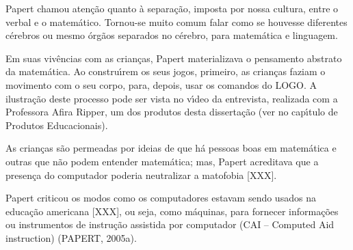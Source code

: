 \documentclass[
12pt,		%
openright,	%
twoside,  %
a4paper,			%
chapter=TITLE,		%
english,			%
french,				%
spanish,			%
brazil				%
]{USPSC-classe/USPSC}
\begin{document}
Papert chamou aten\c{c}\~ao quanto \`a separa\c{c}\~ao, imposta por nossa cultura, entre o verbal e o matem\'atico. Tornou-se muito comum falar como se houvesse diferentes c\'erebros ou mesmo \'org\~aos separados no c\'erebro, para matem\'atica e linguagem.

















Em suas viv\^encias com as crian\c{c}as, Papert materializava o pensamento abstrato da matem\'atica. Ao constru\'{\i}rem os seus jogos, primeiro, as crian\c{c}as faziam o movimento com o seu corpo, para, depois, usar os comandos do LOGO. A ilustra\c{c}\~ao deste processo pode ser vista no v\'{\i}deo  da entrevista, realizada com a Professora Afira Ripper,  um dos produtos desta disserta\c{c}\~ao (ver no cap\'{\i}tulo de Produtos Educacionais).

















As crian\c{c}as s\~ao permeadas por ideias de que h\'a pessoas boas em matem\'atica e outras que n\~ao podem entender matem\'atica; mas, Papert acreditava que a presen\c{c}a do computador poderia neutralizar a matofobia [XXX].

















Papert criticou os modos como os computadores estavam sendo usados na educa\c{c}\~ao americana [XXX], ou seja, como m\'aquinas, para fornecer informa\c{c}\~oes ou instrumentos de instru\c{c}\~ao assistida por computador (CAI – Computed Aid instruction)  (PAPERT, 2005a).
\end{document}
